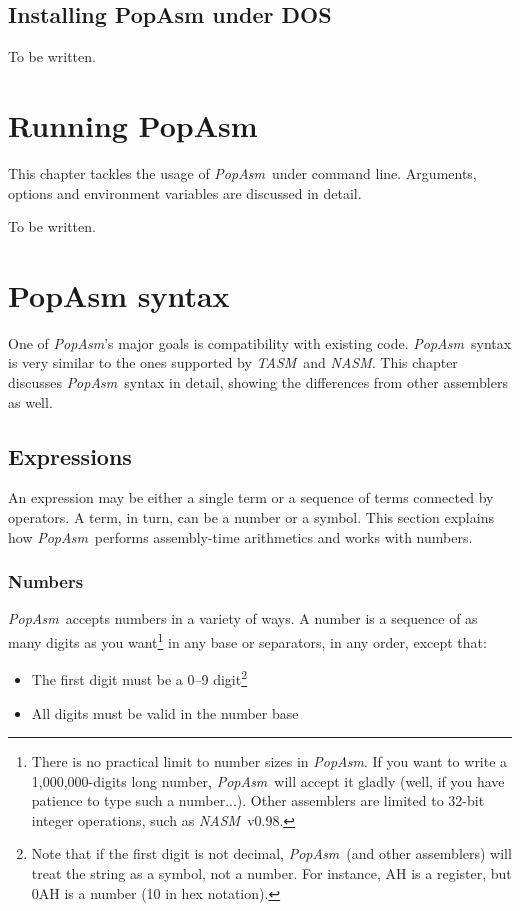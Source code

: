 \documentclass[a4paper,12pt]{book}
\newcommand{\popasm}{\emph{PopAsm}}
\newcommand{\nasm}{\emph{NASM}}
\newcommand{\tasm}{\emph{TASM}}
\begin{document}
\section{Installing PopAsm under DOS}
To be written.

\chapter{Running PopAsm}

This chapter tackles the usage of \popasm\ under command line. Arguments,
options and
environment variables are discussed in detail.

To be written.

\chapter{PopAsm syntax}

One of \popasm's major goals is compatibility with existing code.
\popasm\ syntax is very similar to the ones supported by \tasm\ and
\nasm. This chapter discusses \popasm\ syntax in detail, showing
the differences from other assemblers as well.

\section{Expressions}

An expression may be either a single term or a sequence of terms
connected
by operators. A term, in turn, can be a number or a symbol. This
section
explains how \popasm\ performs assembly-time arithmetics and works with
numbers.

\subsection{Numbers}
\popasm\ accepts numbers in a variety of ways. A number is a sequence
of as many digits as you want\footnote{There is no practical limit to
number sizes in \popasm. If you want to write a 1,000,000-digits long
number, \popasm\ will accept it gladly (well, if you have patience to
type such a number...). Other assemblers are limited to 32-bit integer
operations, such as \nasm\ v0.98.} in any base or separators, in any
order, except that:

\begin{itemize}
\item{The first digit must be a 0--9 digit\footnote{Note that if the
first
digit is not decimal, \popasm\ (and other assemblers) will treat the
string
as a symbol, not a number. For instance, AH is a register, but 0AH is
a number (10 in hex notation).}}
\item{All digits must be valid in the number base}
\end{itemize}
\end{document}
